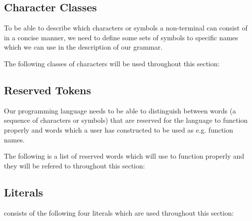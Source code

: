 \subsection{Character Classes}
To be able to describe which characters or symbols a non-terminal can consist of in a concise manner, we need to define some sets of symbols to specific names which we can use in the description of our grammar.

The following classes of characters will be used throughout this section:

\begin{ebnf}
\end{ebnf}

\subsection{Reserved Tokens}
Our programming language needs to be able to distinguish between words (a sequence of characters or symbols) that are reserved for the language to function properly and words which a user has constructed to be used as e.g. function names.

The following is a list of reserved words which \productname{} will use to function properly and they will be refered to throughout this section:

\begin{ebnf}
\end{ebnf}

\subsection{Literals}
\productname{} consists of the following four literals which are used throughout this section:

